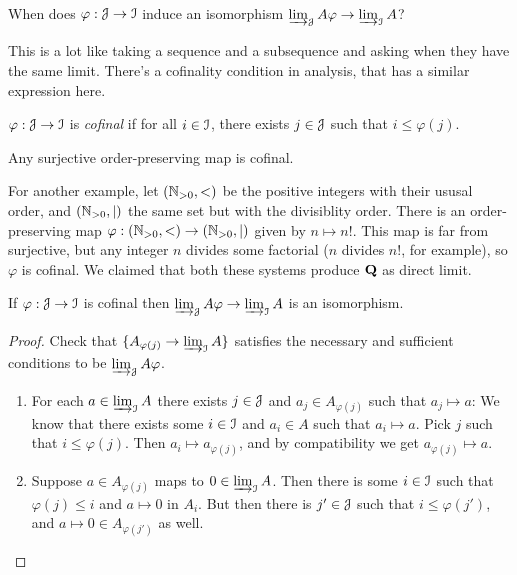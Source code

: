 \begin{question}
When does $\varphi:\mathcal J\to\mathcal I$ induce an isomorphism $\varinjlim_{\mathcal J}A\varphi\to\varinjlim_{\mathcal I}A$?
\end{question}
This is a lot like taking a sequence and a subsequence and asking when they have the same limit. There's a cofinality condition in analysis, that has a similar expression here.
\begin{definition}
$\varphi:\mathcal J\to\mathcal I$ is {\em cofinal} if for all $i\in\mathcal I$, there exists $j\in\mathcal J$ such that $i\leq\varphi(j)$.
\end{definition}
\begin{example}
Any surjective order-preserving map is cofinal. 

For another example, let $(\mathbb N_{>0},<)$ be the positive integers with their
ususal order, and $(\mathbb N_{>0},|)$ the same set but with the divisiblity order.
There is an order-preserving map $\varphi:(\mathbb N_{>0},<)\to(\mathbb N_{>0},|)$ given
by $n\mapsto n!$. This map is far from surjective, but any integer $n$ 
divides some factorial ($n$ divides $n!$, for example), so $\varphi$ is cofinal. 
We claimed that both these systems produce $\mathbf Q$ as direct limit.
\end{example}
\begin{lemma}
If $\varphi:\mathcal J\to\mathcal I$ is cofinal then $\varinjlim_{\mathcal J}A\varphi\to\varinjlim_{\mathcal I}A$ is an isomorphism.
\end{lemma}
\begin{proof}
Check that $\{A_{\varphi(j)}\to\varinjlim_{\mathcal I}A\}$ satisfies the necessary and sufficient conditions to be $\varinjlim_{\mathcal J}A\varphi$.
\begin{enumerate}
\item For each $a\in\varinjlim_{\mathcal I}A$ there exists $j\in\mathcal J$ and $a_j\in A_{\varphi(j)}$ such that $a_j\mapsto a$: We know that there exists some $i\in\mathcal I$ and $a_i\in A$ such that $a_i\mapsto a$. Pick $j$ such that $i\leq\varphi(j)$. Then $a_i\mapsto a_{\varphi(j)}$, and by compatibility we get $a_{\varphi(j)}\mapsto a$.
\item Suppose $a\in A_{\varphi(j)}$ maps to $0\in\varinjlim_{\mathcal I}A$. 
Then there is
some $i\in\mathcal I$ such that $\varphi(j)\leq i$ and $a\mapsto0$ in $A_i$. 
But then there is $j'\in\mathcal J$ such that $i\leq\varphi(j')$, and 
$a\mapsto0\in A_{\varphi(j')}$ as well.
\end{enumerate}
\end{proof}

